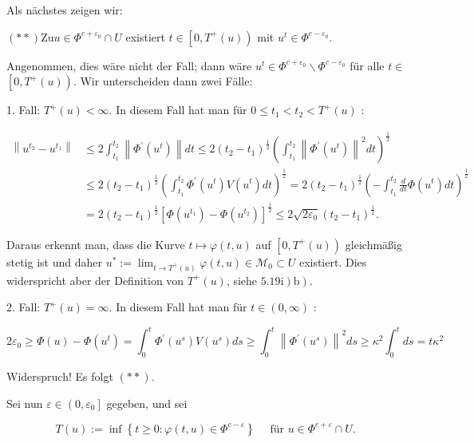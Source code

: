 \documentclass[10pt, letterpaper]{article}
\begin{document}
Als nächstes zeigen wir:

$(* *) \mathrm{Zu} u \in \Phi^{c+\varepsilon_{0}} \cap U$ existiert $t \in\left[0, T^{+}(u)\right)$ mit $u^{t} \in \Phi^{c-\varepsilon_{0}}$.

Angenommen, dies wäre nicht der Fall; dann wäre $u^{t} \in \Phi^{c+\varepsilon_{0}} \backslash \Phi^{c-\varepsilon_{0}}$ für alle $t \in$ $\left[0, T^{+}(u)\right)$. Wir unterscheiden dann zwei Fälle:

1. Fall: $T^{+}(u)<\infty$. In diesem Fall hat man für $0 \leq t_{1}<t_{2}<T^{+}(u)$ :

$$
\begin{aligned}
\left\|u^{t_{2}}-u^{t_{1}}\right\| & \leq 2 \int_{t_{1}}^{t_{2}}\left\|\Phi^{\prime}\left(u^{t}\right)\right\| d t \leq 2\left(t_{2}-t_{1}\right)^{\frac{1}{2}}\left(\int_{t_{1}}^{t_{2}}\left\|\Phi^{\prime}\left(u^{t}\right)\right\|^{2} d t\right)^{\frac{1}{2}} \\
& \leq 2\left(t_{2}-t_{1}\right)^{\frac{1}{2}}\left(\int_{t_{1}}^{t_{2}} \Phi^{\prime}\left(u^{t}\right) V\left(u^{t}\right) d t\right)^{\frac{1}{2}}=2\left(t_{2}-t_{1}\right)^{\frac{1}{2}}\left(-\int_{t_{1}}^{t_{2}} \frac{d}{d t} \Phi\left(u^{t}\right) d t\right)^{\frac{1}{2}} \\
& =2\left(t_{2}-t_{1}\right)^{\frac{1}{2}}\left[\Phi\left(u^{t_{1}}\right)-\Phi\left(u^{t_{2}}\right)\right]^{\frac{1}{2}} \leq 2 \sqrt{2 \varepsilon_{0}}\left(t_{2}-t_{1}\right)^{\frac{1}{2}} .
\end{aligned}
$$

Daraus erkennt man, dass die Kurve $t \mapsto \varphi(t, u)$ auf $\left[0, T^{+}(u)\right)$ gleichmäßig stetig ist und daher $u^{*}:=\lim _{t \rightarrow T^{+}(u)} \varphi(t, u) \in \mathcal{M}_{0} \subset U$ existiert. Dies widerspricht aber der Definition von $T^{+}(u)$, siehe $\left.\left.5.19 \mathrm{i}\right) \mathrm{b}\right)$.

2. Fall: $T^{+}(u)=\infty$. In diesem Fall hat man für $t \in(0, \infty)$ :

$$
2 \varepsilon_{0} \geq \Phi(u)-\Phi\left(u^{t}\right)=\int_{0}^{t} \Phi^{\prime}\left(u^{s}\right) V\left(u^{s}\right) d s \geq \int_{0}^{t}\left\|\Phi^{\prime}\left(u^{s}\right)\right\|^{2} d s \geq \kappa^{2} \int_{0}^{t} d s=t \kappa^{2}
$$

Widerspruch! Es folgt $(* *)$.

Sei nun $\varepsilon \in\left(0, \varepsilon_{0}\right]$ gegeben, und sei

$$
T(u):=\inf \left\{t \geq 0: \varphi(t, u) \in \Phi^{c-\varepsilon}\right\} \quad \text { für } u \in \Phi^{c+\varepsilon} \cap U \text {. }
$$
\end{document}
